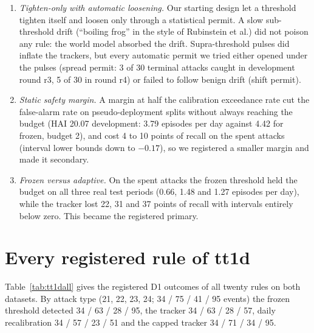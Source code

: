 \documentclass[letterpaper,twocolumn,10pt]{article}
\begin{document}
\begin{enumerate}
\item \emph{Tighten-only with automatic loosening.} Our starting design let a threshold tighten
  itself and loosen only through a statistical permit. A slow sub-threshold drift (``boiling frog''
  in the style of Rubinstein et al.) did not poison any rule: the world model absorbed the drift.
  Supra-threshold pulses did inflate the trackers, but every automatic permit we tried either opened
  under the pulses (spread permit: 3 of 30 terminal attacks caught in development round r3, 5 of 30
  in round r4) or failed to follow benign drift (shift permit).
\item \emph{Static safety margin.} A margin at half the calibration exceedance rate cut the
  false-alarm rate on pseudo-deployment splits without always reaching the budget (HAI 20.07
  development: 3.79 episodes per day against 4.42 for frozen, budget 2), and cost 4 to 10 points of
  recall on the spent attacks (interval lower bounds down to $-0.17$), so we registered a smaller
  margin and made it secondary.
\item \emph{Frozen versus adaptive.} On the spent attacks the frozen threshold held the budget on
  all three real test periods (0.66, 1.48 and 1.27 episodes per day), while the tracker lost 22, 31
  and 37 points of recall with intervals entirely below zero. This became the registered primary.
\end{enumerate}

\FloatBarrier
\section{Every registered rule of tt1d}
\label{app:tt1d}

Table~\ref{tab:tt1dall} gives the registered D1 outcomes of all twenty rules on both datasets. By attack
type (21, 22, 23, 24; 34 / 75 / 41 / 95 events) the frozen threshold detected 34 / 63 / 28 / 95, the tracker
34 / 63 / 28 / 57, daily recalibration 34 / 57 / 23 / 51 and the capped tracker 34 / 71 / 34 / 95.
\end{document}
